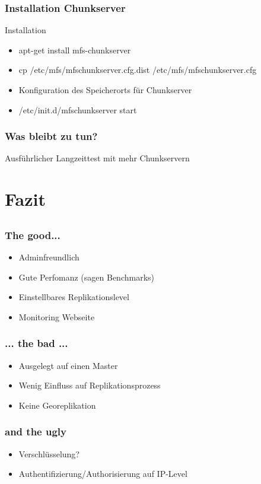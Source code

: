 \documentclass{beamer}
\begin{document}
\begin{frame}
	\frametitle{Installation Chunkserver}
	\begin{block}{Installation}
	\begin{itemize}
		\item apt-get install mfs-chunkserver
		\item cp /etc/mfs/mfschunkserver.cfg.dist /etc/mfs/mfschunkserver.cfg
		\item Konfiguration des Speicherorts f\"ur Chunkserver
		\item /etc/init.d/mfschunkserver start
	\end{itemize}
	\end{block}
\end{frame}	

\begin{frame}
	\frametitle{Was bleibt zu tun?}

	Ausf\"uhrlicher Langzeittest mit mehr Chunkservern
\end{frame}

\section{Fazit}
\subsection*{}

\begin{frame}
	\frametitle{The good...}

	\begin{itemize}
		\item Adminfreundlich
		\item Gute Perfomanz (sagen Benchmarks)
		\item Einstellbares Replikationslevel
		\item Monitoring Webseite
	\end{itemize}
\end{frame}

\begin{frame}
	\frametitle{... the bad ...}
	\begin{itemize}
		\item Ausgelegt auf einen Master
		\item Wenig Einfluss auf Replikationsprozess
		\item Keine Georeplikation
	\end{itemize}
\end{frame} 


\begin{frame}
	\frametitle{and the ugly}
	
	\begin{itemize}
		\item Verschl\"usselung?
		\item Authentifizierung/Authorisierung auf IP-Level
	\end{itemize}
	
\end{frame}
\end{document}
